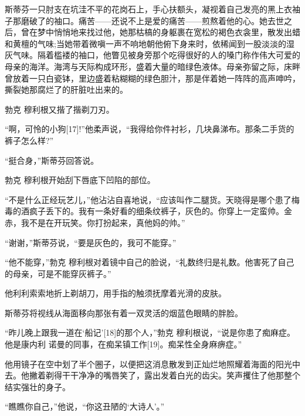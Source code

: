 \documentclass{article}
\begin{document}
斯蒂芬一只肘支在坑洼不平的花岗石上，手心扶额头，凝视着自己发亮的黑上衣袖子那磨破了的袖口。痛苦——还说不上是爱的痛苦——煎熬着他的心。她去世之后，曾在梦中悄悄地来找过他，她那枯槁的身躯裹在宽松的褐色衣衾里，散发出蜡和黄檀的气味;当她带着微嗔一声不响地朝他俯下身来时，依稀闻到一股淡淡的湿灰气味。隔着槛褛的袖口，他瞥见被身旁那个吃得很好的人的嗓门称作伟大可爱的母亲的海洋。海湾与天际构成环形，盛着大量的暗绿色液体。母亲弥留之际，床畔曾放着一只白瓷钵，里边盛着粘糊糊的绿色胆汁，那是伴着她一阵阵的高声呻吟，撕裂她那腐烂了的肝脏吐出来的。



勃克 \cdot 穆利根又揩了揩剃刀刃。



“啊，可怜的小狗[17]!”他柔声说，“我得给你件衬衫，几块鼻涕布。那条二手货的裤子怎么样?”



“挺合身，”斯蒂芬回答说。



勃克 \cdot 穆利根开始刮下唇底下凹陷的部位。



“不是什么正经玩艺儿，”他沾沾自喜地说，“应该叫作二腿货。天晓得是哪个患了梅毒的酒疯子丢下的。我有一条好看的细条纹裤子，灰色的。你穿上一定蛮帅。金赤，我不是在开玩笑。你打扮起来，真他妈的帅。”



“谢谢，”斯蒂芬说，“要是灰色的，我可不能穿。”



“他不能穿，”勃克 \cdot 穆利根对着镜中自己的脸说，“礼数终归是礼数。他害死了自己的母亲，可是不能穿灰裤子。”



他利利索索地折上剃胡刀，用手指的触须抚摩着光滑的皮肤。



斯蒂芬将视线从海面移向那张有着一双灵活的烟蓝色眼睛的胖脸。



“昨儿晚上跟我一道在‘船记’[18]的那个人，”勃克 \cdot 穆利根说，“说是你患了痴麻症。他是康内利 \cdot 诺曼的同事，在痴呆镇工作[19]。痴呆性全身麻痹症。”



他用镜子在空中划了半个圈子，以便把这消息散发到正灿烂地照耀着海面的阳光中去。他撇着剃得干干净净的嘴唇笑了，露出发着白光的齿尖。笑声攫住了他那整个结实强壮的身子。



“瞧瞧你自己，”他说，“你这丑陋的‘大诗人’。”
\end{document}
